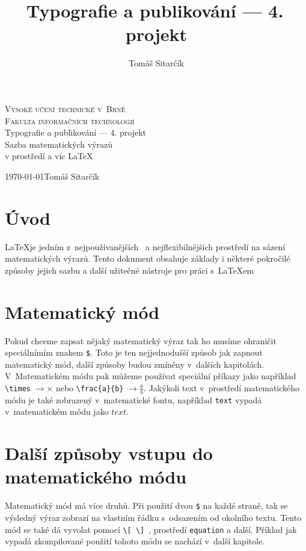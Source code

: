 \documentclass[11pt, a4paper, hyphens]{article}
\title{Typografie a publikování --- 4.\, projekt}
\author{Tomáš Sitarčík}
\begin{document}
\begin{titlepage}
    \begin{center}

        \textsc{\Huge Vysoké učení technické v~Brně\\
            \LARGE Fakulta informačních technologií\\}
        \LARGE
        Typografie a publikování --- 4. projekt\\\Huge Sazba matematických výrazů\\v prostředí a víc \LaTeX

        {\Large \today \hfill Tomáš Sitarčík}

    \end{center}
\end{titlepage}
\newpage

\section{Úvod}
\LaTeX je jedním z~nejpoužívanějších~\cite{MoorheadAltheaV.2021ILuc} a nejflexibilnějších prostředí na sázení matematických výrazů.
Tento dokument obsahuje základy i některé pokročilé způsoby jejich sazbu a další užitečné nástroje pro práci s~\LaTeX em

\section{Matematický mód}
Pokud chceme zapsat nějaký matematický výraz tak ho musíme ohraničit speciálnímím znakem \verb|$|.
Toto je ten nejjednodušší způsob jak zapnout matematický mód, další způsoby budou zmíněny v~dalších kapitolách.
V~Matematickém módu pak můžeme používat speciální příkazy jako například \verb|\times| $\rightarrow \times$ nebo
\verb|\frac{a}{b}| $\rightarrow \frac{a}{b}$. Jakýkoli text v~prostředí matematického módu je také zobrazený v~matematické fontu,
například \verb|text| vypadá v~matematickém módu jako $text$.~\cite{SyropoulosApostolos1900DtuL}

\section{Další způsoby vstupu do matematického módu}
Matematický mód má více druhů. Při použití dvou \verb|$| na každé straně, tak se výsledný výraz zobrazí na vlastním řádku
s~odsazením od okolního textu. Tento mód se také dá vyvolat pomocí \verb|\[ \]|~\cite{MatthewsDavid2019Cbei}, prostředí \verb|equation| a další.
Příklad jak vypadá zkompilované použití tohoto módu se nachází v~další kapitole.
\end{document}
